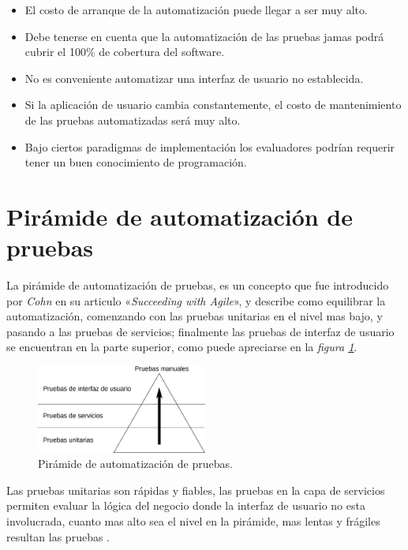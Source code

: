\begin{itemize}
    \item El costo de arranque de la automatización puede llegar a ser muy alto.
    \item Debe tenerse en cuenta que la automatización de las pruebas jamas
        podrá cubrir el 100\% de cobertura del software.
    \item No es conveniente automatizar una interfaz de usuario no establecida.
    \item Si la aplicación de usuario cambia constantemente, el costo de
        mantenimiento de las pruebas automatizadas será muy alto.
    \item Bajo ciertos paradigmas de implementación los evaluadores podrían
        requerir tener un buen conocimiento de programación.
\end{itemize}

\section{Pirámide de automatización de pruebas}
La pirámide de automatización de pruebas, es un concepto que fue introducido
por \emph{Cohn} en su articulo «\emph{Succeeding with Agile}», y describe como
equilibrar la automatización, comenzando con las pruebas unitarias en el nivel
mas bajo, y pasando a las pruebas de servicios; finalmente las pruebas de
interfaz de usuario se encuentran en la parte superior, como puede apreciarse en
la \emph{figura \ref{piramide}}.

\begin{figure}[H]
\centering
\includegraphics[width=0.5\textwidth]{graphics/pyramid.eps}
\caption{Pirámide de automatización de pruebas.}
\label{piramide}
\end{figure}

Las pruebas unitarias son rápidas y fiables, las pruebas en la capa de servicios
permiten evaluar la lógica del negocio donde la interfaz de usuario no esta
involucrada, cuanto mas alto sea el nivel en la pirámide, mas lentas y frágiles
resultan las pruebas \parencite{Cohn}.

